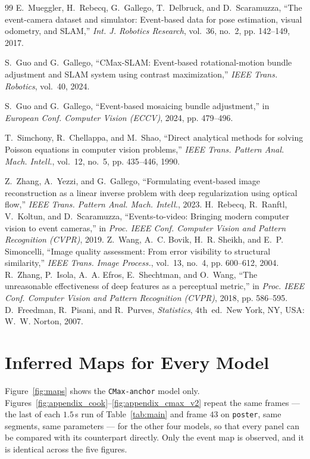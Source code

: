 \documentclass[journal]{IEEEtran}
\begin{document}
\begin{thebibliography}{99}
E.~Mueggler, H.~Rebecq, G.~Gallego, T.~Delbruck, and D.~Scaramuzza, ``The
event-camera dataset and simulator: Event-based data for pose estimation, visual
odometry, and SLAM,'' \emph{Int. J. Robotics Research}, vol.~36, no.~2, pp.
142--149, 2017.

S.~Guo and G.~Gallego, ``CMax-SLAM: Event-based rotational-motion bundle
adjustment and SLAM system using contrast maximization,'' \emph{IEEE Trans.
Robotics}, vol.~40, 2024.

S.~Guo and G.~Gallego, ``Event-based mosaicing bundle adjustment,'' in
\emph{European Conf. Computer Vision (ECCV)}, 2024, pp. 479--496.

T.~Simchony, R.~Chellappa, and M.~Shao, ``Direct analytical methods for solving
Poisson equations in computer vision problems,'' \emph{IEEE Trans. Pattern Anal.
Mach. Intell.}, vol.~12, no.~5, pp. 435--446, 1990.

Z.~Zhang, A.~Yezzi, and G.~Gallego, ``Formulating event-based image
reconstruction as a linear inverse problem with deep regularization using
optical flow,'' \emph{IEEE Trans. Pattern Anal. Mach. Intell.}, 2023.
H.~Rebecq, R.~Ranftl, V.~Koltun, and D.~Scaramuzza, ``Events-to-video:
Bringing modern computer vision to event cameras,'' in \emph{Proc. IEEE Conf.
Computer Vision and Pattern Recognition (CVPR)}, 2019.
Z.~Wang, A.~C. Bovik, H.~R. Sheikh, and E.~P. Simoncelli, ``Image quality
assessment: From error visibility to structural similarity,'' \emph{IEEE
Trans. Image Process.}, vol.~13, no.~4, pp. 600--612, 2004.
R.~Zhang, P.~Isola, A.~A. Efros, E.~Shechtman, and O.~Wang, ``The
unreasonable effectiveness of deep features as a perceptual metric,'' in
\emph{Proc. IEEE Conf. Computer Vision and Pattern Recognition (CVPR)}, 2018,
pp. 586--595.
D.~Freedman, R.~Pisani, and R.~Purves, \emph{Statistics}, 4th~ed.\ New York,
NY, USA: W.~W. Norton, 2007.

\end{thebibliography}


\appendices
\section{Inferred Maps for Every Model}
\label{app:maps}

Figure~\ref{fig:maps} shows the \texttt{CMax-anchor} model only.
Figures~\ref{fig:appendix_cook}--\ref{fig:appendix_cmax_v2} repeat the same
frames --- the last of each $1.5$\,s run of Table~\ref{tab:main} and frame
$43$ on \texttt{poster}, same segments, same parameters --- for the other four
models, so that every panel can be compared with its counterpart directly. Only
the event map is observed, and it is identical across the five figures.
\end{document}

